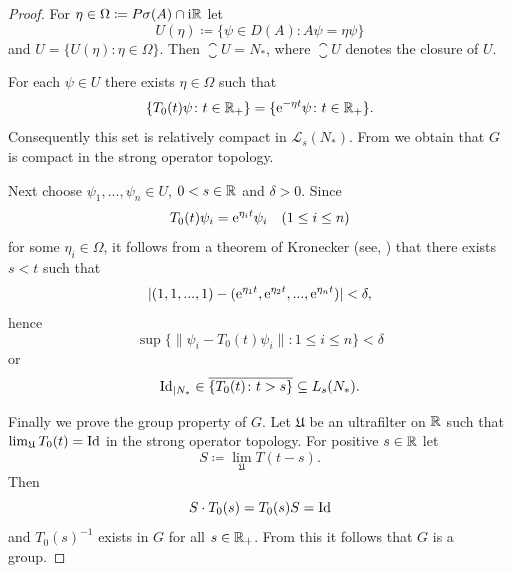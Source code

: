 \begin{proof}
For $\eta \in \Omega \coloneq P\sigma(A) \cap \mathrm{i}\mathbb{R}$ let
\[
U(\eta) \coloneq \{\psi \in D(A): A\psi = \eta\psi\}
\]
and $U = \{U(\eta) \colon \eta \in \Omega\}$. 
Then $\closure{U} = N_{*}$, where $\closure{U}$ denotes the closure of $U$.

For each $\psi \in U$ there exists $\eta \in \Omega$ such that
\[
\{T_{0}(t)\psi \colon t \in \mathbb{R}_{+}\} = \{\mathrm{e}^{-\eta t}\psi \colon t \in \mathbb{R}_{+}\} .
\]
Consequently this set is relatively compact in $\mathcal{L}_{s}(N_{*})$.
From \textcite[III.4.5]{schaefer:1966} we obtain that $G$ is compact in the strong operator topology.

Next choose $\psi_{1}, ..., \psi_{n} \in U$, $0 < s \in \mathbb{R}$ and $\delta > 0$.
Since 
\[
T_{0}(t)\psi_{i} = \eu^{\eta_{i}t}\psi_{i} 
\quad (1 \leq i \leq n)
\]
for some $\eta_{i} \in \Omega$, it follows from a theorem of Kronecker (see, \textcite[Satz 6.1., p.77]{jacobs:1972}) that there exists $s < t$ such that
\[
|(1,1, ..., 1) - (\mathrm{e}^{\eta_{1}t}, \mathrm{e}^{\eta_{2}t}, ..., \mathrm{e}^{\eta_{n}t})| < \delta ,
\]
hence
\[
\sup\{\|\psi_{i} - T_{0}(t)\psi_{i}\| \colon 1 \leq i \leq n\} < \delta
\]
or 
\[
\operatorname{Id}_{|N_{*}} \in \overline{\{T_{0}(t) \colon t>s\}} \subseteq L_{s}(N_{*}).
\]

Finally we prove the group property of\/ $G$.
Let $\mathfrak{U}$ be an ultrafilter on $\mathbb{R}$ such that $\lim_{\mathfrak{U}}T_{0}(t) = \operatorname{Id}$ in the strong operator topology.
For positive $s \in \mathbb{R}$ let 
%
\[
	S \coloneq \lim_{\mathfrak{U}}T(t-s) .
\]
%
Then 
%
\[
	S \cdot T_{0}(s) = T_{0}(s)S = \operatorname{Id}
\]
%
and $T_{0}(s)^{-1}$ exists in $G$ for all $s \in \mathbb{R}_{+}$.
From this it follows that $G$ is a group.
\end{proof}
